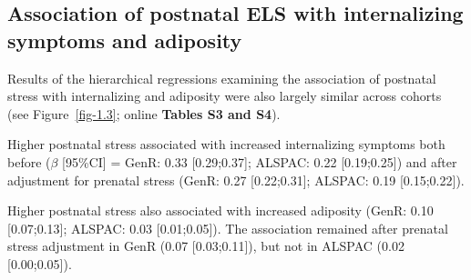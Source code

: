 \documentclass[
  letterpaper,
  DIV=11,
  numbers=noendperiod]{scrreport}
\begin{document}
\subsection{Association of postnatal ELS with internalizing symptoms and
adiposity}\label{association-of-postnatal-els-with-internalizing-symptoms-and-adiposity-1}

Results of the hierarchical regressions examining the association of
postnatal stress with internalizing and adiposity were also largely
similar across cohorts (see Figure~\ref{fig-1.3}; online \textbf{Tables
S3 and S4}).

Higher postnatal stress associated with increased internalizing symptoms
both before (\(\beta\) {[}95\%CI{]} = GenR: 0.33 {[}0.29;0.37{]};
ALSPAC: 0.22 {[}0.19;0.25{]}) and after adjustment for prenatal stress
(GenR: 0.27 {[}0.22;0.31{]}; ALSPAC: 0.19 {[}0.15;0.22{]}).

Higher postnatal stress also associated with increased adiposity (GenR:
0.10 {[}0.07;0.13{]}; ALSPAC: 0.03 {[}0.01;0.05{]}). The association
remained after prenatal stress adjustment in GenR (0.07
{[}0.03;0.11{]}), but not in ALSPAC (0.02 {[}0.00;0.05{]}).
\end{document}
